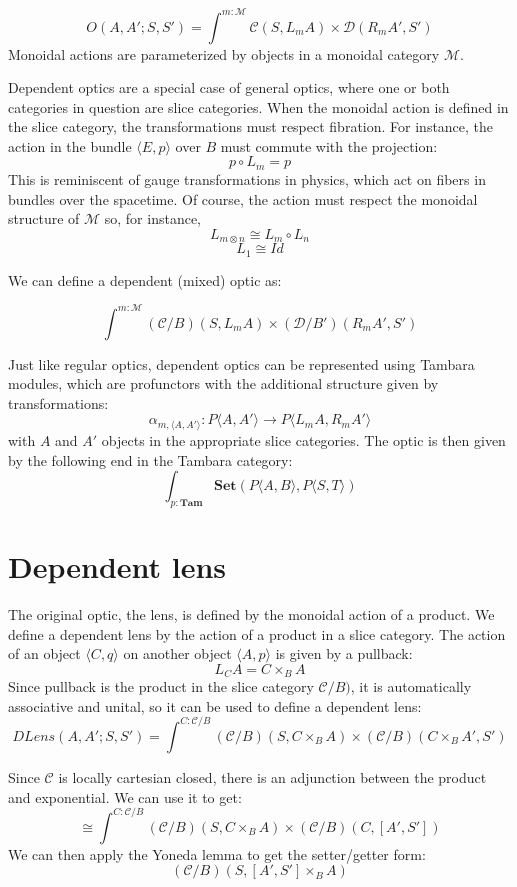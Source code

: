 \documentclass[11pt]{amsart}
\begin{document}
\[ O(A, A'; S, S') =  \int^{m \colon \mathcal{M}} \mathcal{C}( S, L_m A) \times \mathcal{D}(R_m A', S') \]
Monoidal actions are parameterized by objects in a monoidal category $\mathcal{M}$.

Dependent optics are a special case of general optics, where one or both categories in question are slice categories. When the monoidal action is defined in the slice category, the transformations must respect fibration. For instance, the action in the bundle $\langle E, p \rangle$ over $B$ must commute with the projection:
\[p \circ L_m = p \]
This is reminiscent of gauge transformations in physics, which act on fibers in bundles over the spacetime. Of course, the action must respect the monoidal structure of $\mathcal{M}$ so, for instance,
\[L_{m \otimes n} \cong L_m \circ L_n \]
\[ L_1 \cong \mathit{Id} \]

We can define a dependent (mixed) optic as:

\[ \int^{m \colon \mathcal{M}} (\mathcal{C}/B)( S, L_m A) \times (\mathcal{D}/B')(R_m A', S') \]

Just like regular optics, dependent optics can be represented using Tambara modules, which are profunctors with the additional structure given by transformations:
\[ \alpha_{m, \langle A, A' \rangle} \colon P \langle A, A' \rangle \to P\langle L_m A, R_m A' \rangle \]
with $A$ and $A'$ objects in the appropriate slice categories.
The optic is then given by the following end in the Tambara category:
\[ \int_{p \colon \mathbf{Tam}} \mathbf{Set}(P \langle A, B \rangle, P \langle S, T \rangle) \]


\section{Dependent lens}

The original optic, the lens, is defined by the monoidal action of a product. We define a dependent lens by the action of a product in a slice category. The action of an object $\langle C, q \rangle$ on another object $ \langle A, p \rangle$ is given by a pullback:
\[ L_C A = C \times_B A \]
Since pullback is the product in the slice category $\mathcal{C}/B)$, it is automatically associative and unital, so it can be used to define a dependent lens:
\[ \mathit{DLens}(A, A'; S, S') = \int^{C \colon \mathcal{C}/B} (\mathcal{C}/B)( S, C \times_B A) \times (\mathcal{C}/B)(C \times_B A', S')\]


Since $\mathcal{C}$ is locally cartesian closed, there is an adjunction between the product and exponential. We can use it to get:
\[ \cong \int^{C \colon \mathcal{C}/B} (\mathcal{C}/B)( S, C \times_B A) \times (\mathcal{C}/B)(C , [A', S']) \]
We can then apply the Yoneda lemma to get the setter/getter form:
\[  (\mathcal{C}/B)( S, [A', S'] \times_B A) \]
\end{document}
